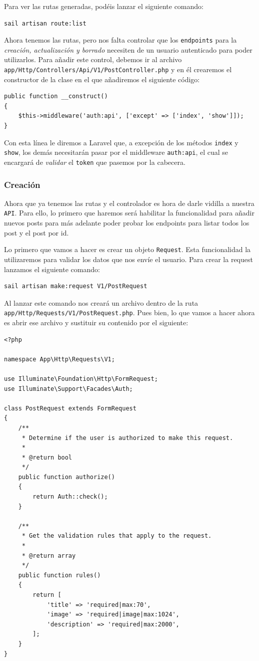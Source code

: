 \documentclass[11pt]{article}
\begin{document}
Para ver las rutas generadas, podéis lanzar el siguiente comando:
\begin{verbatim}
sail artisan route:list
\end{verbatim}

Ahora tenemos las rutas, pero nos falta controlar que los \texttt{endpoints}
para la \emph{creación, actualización y borrado} necesiten de un usuario
autenticado para poder utilizarlos. Para añadir este control, debemos
ir al archivo \texttt{app/Http/Controllers/Api/V1/PostController.php} y en él
crearemos el constructor de la clase en el que añadiremos el siguiente
código:
\begin{verbatim}
public function __construct()
{
    $this->middleware('auth:api', ['except' => ['index', 'show']]);
}
\end{verbatim}

Con esta línea le diremos a Laravel que, a excepción de los métodos
\texttt{index} y \texttt{show}, los demás necesitarán pasar por el middleware
\texttt{auth:api}, el cual se encargará de \emph{validar} el \texttt{token} que pasemos por
la cabecera.

\subsubsection{Creación}
\label{sec:orgc483b0c}
Ahora que ya tenemos las rutas y el controlador es hora de darle
vidilla a nuestra \texttt{API}. Para ello, lo primero que haremos será
habilitar la funcionalidad para añadir nuevos posts para más adelante
poder probar los endpoints para listar todos los post y el post por
id.

Lo primero que vamos a hacer es crear un objeto \texttt{Request}. Esta
funcionalidad la utilizaremos para validar los datos que nos envíe el
usuario. Para crear la request lanzamos el siguiente comando:
\begin{verbatim}
sail artisan make:request V1/PostRequest
\end{verbatim}

Al lanzar este comando nos creará un archivo dentro de la ruta
\texttt{app/Http/Requests/V1/PostRequest.php}. Pues bien, lo que vamos a hacer
ahora es abrir ese archivo y sustituir su contenido por el siguiente:
\begin{verbatim}
<?php

namespace App\Http\Requests\V1;

use Illuminate\Foundation\Http\FormRequest;
use Illuminate\Support\Facades\Auth;

class PostRequest extends FormRequest
{
    /**
     * Determine if the user is authorized to make this request.
     *
     * @return bool
     */
    public function authorize()
    {
        return Auth::check();
    }

    /**
     * Get the validation rules that apply to the request.
     *
     * @return array
     */
    public function rules()
    {
        return [
            'title' => 'required|max:70',
            'image' => 'required|image|max:1024',
            'description' => 'required|max:2000',
        ];
    }
}
\end{verbatim}
\end{document}
